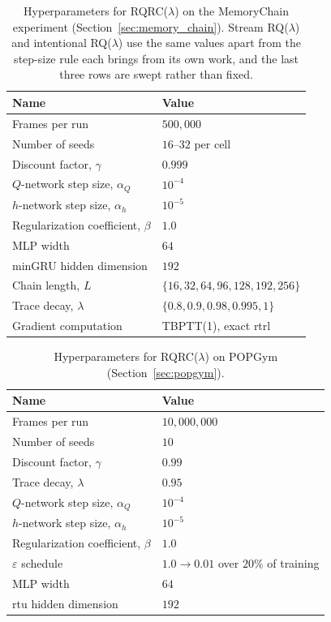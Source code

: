 \documentclass{article}
\begin{document}
\begin{table}[htbp]
\centering
\caption{Hyperparameters for RQRC($\lambda$) on the MemoryChain experiment
(Section~\ref{sec:memory_chain}). Stream RQ($\lambda$) and intentional RQ($\lambda$) use the same
values apart from the step-size rule each brings from its own work, and the last three rows are
swept rather than fixed.}
\label{tab:hparams-MemoryChain}
\begin{tabular}{ll}
\toprule
Name & Value \\
\midrule
Frames per run                         & $500{,}000$ \\
Number of seeds                        & $16$--$32$ per cell \\
Discount factor, $\gamma$              & $0.999$ \\
$Q$-network step size, $\alpha_Q$      & $10^{-4}$ \\
$h$-network step size, $\alpha_h$      & $10^{-5}$ \\
Regularization coefficient, $\beta$ & $1.0$ \\
MLP width                              & $64$ \\
minGRU hidden dimension                & $192$ \\
\midrule
Chain length, $L$                      & $\{16, 32, 64, 96, 128, 192, 256\}$ \\
Trace decay, $\lambda$                 & $\{0.8, 0.9, 0.98, 0.995, 1\}$ \\
Gradient computation                   & TBPTT(1), exact \gls{rtrl} \\
\bottomrule
\end{tabular}
\end{table}

\begin{table}[htbp]
\centering
\caption{Hyperparameters for RQRC($\lambda$) on POPGym (Section~\ref{sec:popgym}).}
\label{tab:hparams-popgym-streaming}
\begin{tabular}{ll}
\toprule
Name & Value \\
\midrule
Frames per run                         & $10{,}000{,}000$ \\
Number of seeds                        & $10$ \\
Discount factor, $\gamma$              & $0.99$ \\
Trace decay, $\lambda$                 & $0.95$ \\
$Q$-network step size, $\alpha_Q$      & $10^{-4}$ \\
$h$-network step size, $\alpha_h$      & $10^{-5}$ \\
Regularization coefficient, $\beta$ & $1.0$ \\
$\varepsilon$ schedule             & $1.0 \to 0.01$ over $20\%$ of training \\
MLP width                              & $64$ \\
\gls{rtu} hidden dimension             & $192$ \\
\bottomrule
\end{tabular}
\end{table}
\end{document}
